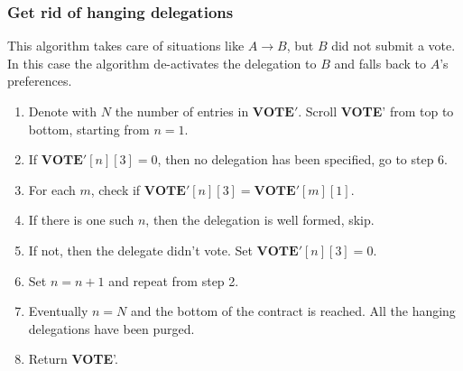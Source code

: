 \documentclass[submission, copyright,creativecommons,sharealike,noncommercial]{eptcs}
\newcommand{\Vote}{\textbf{VOTE}\xspace}
\begin{document}
\subsubsection{Get rid of hanging delegations}\label{subsubsec:Get rid of hanging delegations}
	This algorithm takes care of situations like $A \to B$, but $B$ did not submit a vote. In this case the algorithm de-activates the delegation to $B$ and falls back to $A$'s preferences.
	\begin{enumerate}
		\item Denote with $N$ the number of entries in $\Vote'$. Scroll \Vote' from top to bottom, starting from $n=1$.
		\item If $\Vote'[n][3]=0$, then no delegation has been specified, go to step 6.
		\item For each $m$, check if $\Vote'[n][3] = \Vote'[m][1]$.
		\item If there is one such $n$, then the delegation is well formed, skip.
		\item If not, then the delegate didn't vote. Set $\Vote'[n][3] = 0$.
		\item Set $n=n+1$ and repeat from step 2.
		\item Eventually $n = N$ and the bottom of the contract is reached. All the hanging delegations have been purged.
		\item Return \Vote'.
	\end{enumerate}

	
\end{document}
